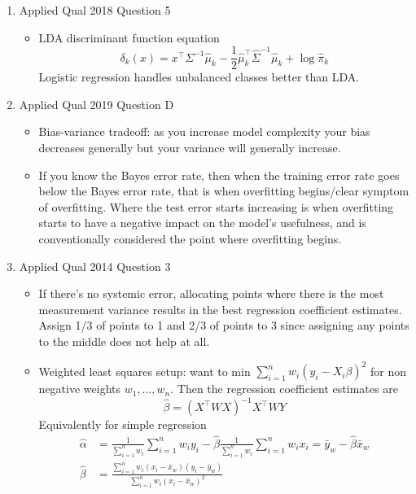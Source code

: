 \documentclass{article}
\begin{document}
\begin{itemize}
\begin{enumerate}[label=(\alph*)]
    \item Applied Qual 2018 Question 5
      \begin{itemize}
        \item LDA discriminant function equation
          \[ \delta_k (x) = x^\top \Sigma^{-1}\hat{\mu}_k  - \frac{1}{2} \hat{\mu}_k^\top \hat{\Sigma}^{-1} \hat{\mu}_k + \log \hat{\pi}_k \]
          Logistic regression handles unbalanced classes better than LDA.
      \end{itemize}
    \item Applied Qual 2019 Question D
      \begin{itemize}
        \item Bias-variance tradeoff: as you increase model complexity your bias decreases generally but your variance will generally increase.
        \item If you know the Bayes error rate, then when the training error rate goes below the Bayes error rate, that is when overfitting begins/clear symptom of overfitting. Where the test error starts increasing is when overfitting starts to have a negative impact on the model's usefulness, and is conventionally considered the point where overfitting begins.
      \end{itemize}
    \item Applied Qual 2014 Question 3
      \begin{itemize}
        \item If there's no systemic error, allocating points where there is the most measurement variance results in the best regression coefficient estimates. Assign 1/3 of points to 1 and 2/3 of points to 3 since assigning any points to the middle does not help at all.
        \item Weighted least squares setup: want to min $\sum_{i=1}^{n}w_i(y_i - X_i \beta)^2$ for non negative weights $w_1, \ldots, w_n$. Then the regression coefficient estimates are
          \[ \hat{\beta} = (X^\top W X)^{-1} X^\top W Y \]
          Equivalently for simple regression
          \begin{align*}
            \hat{\alpha} &= \frac{1}{\sum_{i=1}^{n}w_i} \sum_{i=1}^{n}w_i y_i - \hat{\beta} \frac{1}{\sum_{i=1}^{n}w_i} \sum_{i=1}^{n}w_i x_i = \bar{y}_w - \hat{\beta} \bar{x}_w\\
            \hat{\beta} &= \frac{\sum_{i=1}^{n} w_i (x_i - \bar{x}_w)(y_i - \bar{y}_w)}{\sum_{i=1}^{n} w_i (x_i - \bar{x}_w)^2}
          \end{align*}
      \end{itemize}

\end{enumerate}
\end{itemize}
\end{document}
